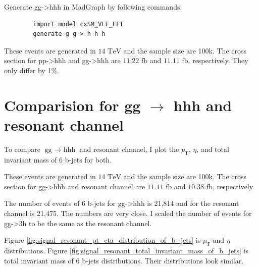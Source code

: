 \documentclass[12pt]{article}
\begin{document}
	Generate gg->hhh in MadGraph by following commands:
	\begin{verbatim}
		import model cxSM_VLF_EFT
		generate g g > h h h	
	\end{verbatim}

	These events are generated in $\text{14 TeV}$ and the sample size are 100k. The cross section for pp->hhh and gg->hhh are $\text{11.22 fb}$ and $\text{11.11 fb}$, respectively. They only differ by 1\%.
\section{Comparision for \texorpdfstring{gg $\to $ hhh}{gg to hhh} and resonant channel}%
\label{sec:comparision_for_gg_hhh_and_resonant_channel}
	To compare $\text{gg $\to $ hhh}$ and resonant channel, I plot the $p_\text{T}$, $\eta$, and total invariant mass of 6 b-jets for both.

	These events are generated in $\text{14 TeV}$ and the sample size are 100k. The cross section for gg->hhh and resonant channel are $\text{11.11 fb}$ and $\text{10.38 fb}$, respectively.

	The number of events of 6 b-jets for gg->hhh is 21,814 and for the resonant channel is 21,475. The numbers are very close. I scaled the number of events for gg->3h to be the same as the resonant channel.

	Figure \ref{fig:signal_resonant_pt_eta_distribution_of_b_jets} is $p_\text{T}$ and $\eta$ distributions. Figure \ref{fig:signal_resonant_total_invariant_mass_of_b_jets} is total invariant mass of 6 b-jets distributions. Their distributions look similar.
\end{document}
